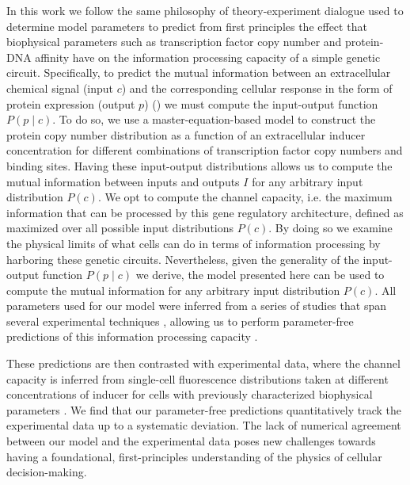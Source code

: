 In this work we follow the same philosophy of theory-experiment dialogue used
to determine model parameters to predict from first principles the effect that
biophysical parameters such as transcription factor copy number and protein-DNA
affinity have on the information processing capacity of a simple genetic
circuit. Specifically, to predict the mutual information between an
extracellular chemical signal (input $c$) and the corresponding cellular
response in the form of protein expression (output $p$) ()
we must compute the input-output function $P(p \mid c)$. To do so, we use a
master-equation-based model to construct the protein copy number distribution
as a function of an extracellular inducer concentration for different
combinations of transcription factor copy numbers and binding sites. Having
these input-output distributions allows us to compute the mutual information
between inputs and outputs $I$ for any arbitrary input distribution $P(c)$. We
opt to compute the channel capacity, i.e. the maximum information that can be
processed by this gene regulatory architecture, defined as
 maximized over all possible input distributions $P(c)$.
By doing so we examine the physical limits of what cells can do in terms of
information processing by harboring these genetic circuits. Nevertheless, given
the generality of the input-output function $P(p \mid c)$ we derive, the model
presented here can be used to compute the mutual information for any arbitrary
input distribution $P(c)$. All parameters used for our model were inferred from
a series of studies that span several experimental techniques
\cite{Garcia2011c, Jones2014a, Brewster2014, Razo-Mejia2018}, allowing us to
perform parameter-free predictions of this information processing capacity
\cite{Phillips2019}.

These predictions are then contrasted with experimental data, where the channel
capacity is inferred from single-cell fluorescence distributions taken at
different concentrations of inducer for cells with previously characterized
biophysical parameters \cite{Garcia2011c, Razo-Mejia2018}. We find that our
parameter-free predictions quantitatively track the experimental data up to a
systematic deviation. The lack of numerical agreement between our model and the
experimental data poses new challenges towards having a foundational,
first-principles understanding of the physics of cellular decision-making.

